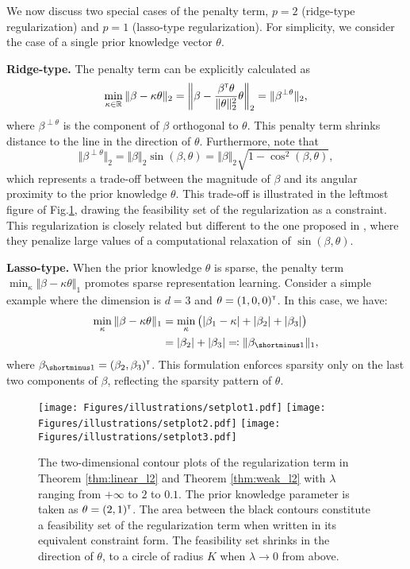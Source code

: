\documentclass[12pt]{article}
\begin{document}
\begin{remark}
    We now discuss two special cases of the penalty term, $p=2$ (ridge-type regularization) and $p=1$ (lasso-type regularization). For simplicity, we consider the case of a single prior knowledge vector $\theta$.
    
    \textbf{Ridge-type.} The penalty term can be explicitly calculated as \[
    \min_{\kappa \in \mathbb{R}} \Vert \beta - \kappa \theta \Vert_2 = \left\Vert \beta - \dfrac{\beta^{\scriptscriptstyle \sf T} \theta}{\Vert \theta \Vert_2^2} \theta \right\Vert_2 = \Vert \beta^{\perp \theta} \Vert_2,
    \]where $\beta^{\perp \theta}$ is the component of $\beta$ orthogonal to $\theta$. This penalty term shrinks distance to the line in the direction of $\theta$. Furthermore, note that 
    \[
    \Vert \beta^{\perp \theta} \Vert_2 = \Vert \beta \Vert_2 \sin(\beta, \theta) = \Vert \beta \Vert_2 \sqrt{1 - \cos^2(\beta, \theta)},
    \]
    which represents a trade-off between the magnitude of $\beta$ and its angular proximity to the prior knowledge $\theta$. This trade-off is illustrated in the leftmost figure of Fig.\ref{fig:feasibleset_illustration}, drawing the feasibility set of the regularization as a constraint. This regularization is closely related but different to the one proposed in \cite{gu2024angle-based}, where they penalize large values of a computational relaxation of $\sin{(\beta,\theta)}$.
    
    \textbf{Lasso-type.} When the prior knowledge $\theta$ is sparse, the penalty term $\min_\kappa \Vert \beta - \kappa \theta \Vert_1$ promotes sparse representation learning. Consider a simple example where the dimension is $d = 3$ and $\theta = (1, 0, 0)^{\scriptscriptstyle \sf T}$. In this case, we have:
    \begin{align*}
        \min_\kappa \Vert \beta - \kappa \theta \Vert_1 &= \min_\kappa \big(|\beta_1 - \kappa| + |\beta_2| + |\beta_3|\big) \\
        &= |\beta_2| + |\beta_3| \eqqcolon \Vert \beta_{\shortminus 1} \Vert_1,
    \end{align*}
    where $\beta_{\shortminus 1} = (\beta_2, \beta_3)\trans$. This formulation enforces sparsity only on the last two components of $\beta$, reflecting the sparsity pattern of $\theta$.
\end{remark}

\begin{figure*}[ht]
    \centering
    \texttt{[image: Figures/illustrations/setplot1.pdf]}
    \hfill
    \texttt{[image: Figures/illustrations/setplot2.pdf]}
    \hfill
    \texttt{[image: Figures/illustrations/setplot3.pdf]}
    \caption{The two-dimensional contour plots of the regularization term in Theorem \ref{thm:linear_l2} and Theorem \ref{thm:weak_l2} with $\lambda$ ranging from $+\infty$ to $2$ to $0.1$. The prior knowledge parameter is taken as $\theta = (2,1)^{\scriptscriptstyle \sf T}$. The area between the black contours constitute a feasibility set of the regularization term when written in its equivalent constraint form. The feasibility set shrinks in the direction of $\theta$, to a circle of radius $K$ when $\lambda \to 0$ from above.}
    \label{fig:feasibleset_illustration}
\end{figure*}
\end{document}
